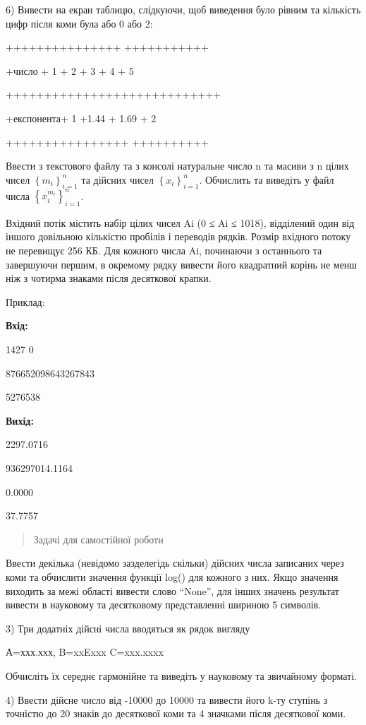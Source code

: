 \documentclass[]{article}
\begin{document}
6) Вивести на екран таблицю, слідкуючи, щоб виведення було рівним та
кількість цифр після коми була або 0 або 2:

+++++++++++++++ +++++++++++

+число + 1 + 2 + 3 + 4 + 5

++++++++++++++++++++++++++++

+експонента+ 1 +1.44 + 1.69 + 2

++++++++++++++++ ++++++++++

Ввести з текстового файлу та з консолі натуральне число n та масиви з n
цілих чисел \(\left\{ m_{i} \right\}_{i = 1}^{n}\) та дійсних чисел
\(\left\{ x_{i} \right\}_{i = 1}^{n}\). Обчислить та виведіть у файл
числа \(\left\{ x_{i}^{m_{i}} \right\}_{i = 1}^{n}\).

Вхідний потік містить набір цілих чисел Ai (0 ≤ Ai ≤ 1018), відділений
один від іншого довільною кількістю пробілів і переводів рядків. Розмір
вхідного потоку не перевищує 256 КБ. Для кожного числа Ai, починаючи з
останнього та завершуючи першим, в окремому рядку вивести його
квадратний корінь не менш ніж з чотирма знаками після десяткової крапки.

Приклад:

\textbf{Вхід:}

1427 0

876652098643267843

5276538

\textbf{Вихід: }

2297.0716

936297014.1164

0.0000

37.7757

\begin{quote}
Задачі для самостійної роботи
\end{quote}

Ввести декілька (невідомо зазделегідь скільки) дійсних числа записаних
через коми та обчислити значення функції log() для кожного з них. Якщо
значення виходить за межі області вивести слово ``None'', для інших
значень результат вивести в науковому та десятковому представленні
шириною 5 символів.

3) Три додатніх дійсні числа вводяться як рядок вигляду

А=ххх.ххх, B=xxExxx C=xxx.xxxx

Обчисліть їх середнє гармонійне та виведіть у науковому та звичайному
форматі.

4) Ввести дійсне число від -10000 до 10000 та вивести його k-ту ступінь
з точністю до 20 знаків до десяткової коми та 4 значками після
десяткової коми.
\end{document}
